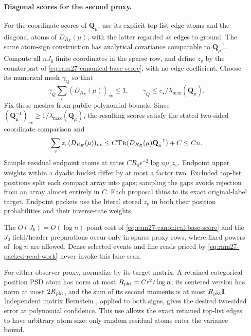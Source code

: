 \documentclass[11pt]{article}
\theoremstyle{remark}
\newcommand{\II}{\mathbf I}
\newcommand{\QQ}{\mathbf Q}
\newcommand{\tr}{\textsc{Tr}}
\begin{document}
\paragraph{Diagonal scores for the second proxy.}
For the coordinate scores of $\QQ_\mu$, use its explicit top-list edge atoms and the
diagonal atoms of $D_{R_E}(\mu)$, with the latter regarded as edges to ground.
The same atom-sign construction has analytical covariance comparable to
$\QQ_\mu^{-1}$.
Compute all $nJ_0$ finite coordinates in the sparse row, and define $z_v$ by the
counterpart of \eqref{eq:ram27-canonical-base-score}, with no edge coefficient.
Choose its numerical mesh $\gamma_Q$ so that
\[
 \gamma_Q\sum_v(D_{R_E}(\mu))_{vv}\le1,\qquad
 \gamma_Q\le c_\star/\lambda_{\max}(\QQ_\mu).
\]
Fix these meshes from public polynomial bounds.
Since $(\QQ_\mu^{-1})_{vv}\ge1/\lambda_{\max}(\QQ_\mu)$, the resulting scores satisfy
the stated two-sided coordinate comparison and
\[
 \sum_vz_v(D_{R_E}(\mu))_{vv}
 \le C\tr(D_{R_E}(\mu)\QQ_\mu^{-1})+C
 \le Cn .
\]
Sample residual endpoint atoms at rates $C R_0\epsilon^{-2}\log n\mu_ez_v$.
Endpoint upper weights within a dyadic bucket differ by at most a factor two.
Excluded top-list positions split each compact array into gaps; sampling the
gaps avoids rejection from an array almost entirely in $C$.
Each proposal thins to its exact original-label target.
Endpoint packets use the literal stored $z_v$ in both their position
probabilities and their inverse-rate weights.

The $O(J_0)=O(\log n)$ point cost of \eqref{eq:ram27-canonical-base-score} and the
$J_0$ field/header preparations occur only in sparse proxy rows, where fixed
powers of $\log n$ are allowed.
Dense selected events and fine reads priced by \eqref{eq:ram27-packed-read-work}
never invoke this lane scan.

For either observer proxy, normalize by its target matrix.
A retained categorical-position PSD atom has norm at most $R_{\rm
pkt}=C\epsilon^2/\log n$; its centered version has norm at most $2R_{\rm pkt}$, and
the sum of its second moments is at most $R_{\rm pkt}\II$.
Independent matrix Bernstein \cite[Theorem~1.4]{T12:journal}, applied to both
signs, gives the desired two-sided error at polynomial confidence.
This use allows the exact retained top-list edges to have arbitrary atom size:
only random residual atoms enter the variance bound.
\end{document}
